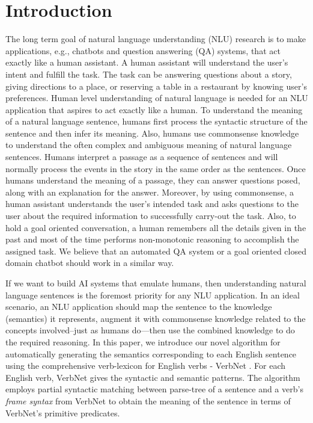 \documentclass[letterpaper]{article}
\begin{document}
\section{Introduction}

The long term goal of natural language understanding (NLU) research is to make applications, e.g., chatbots and question answering (QA) systems, that act exactly like a human assistant. A human assistant will understand the user's intent and fulfill the task. The task can be answering questions about a story, giving directions to a place, or  reserving a table in a restaurant by knowing user's preferences. Human level understanding of natural language is needed for an NLU application that aspires to act exactly like a human. To understand the meaning of a natural language sentence, humans first process the syntactic structure of the sentence and then infer its meaning. Also, humans use commonsense knowledge to understand the often complex and ambiguous meaning of natural language sentences. Humans interpret a passage as a sequence of sentences and will normally process the events in the story in the same order as the sentences. Once humans understand the meaning of a passage, they can answer questions posed, along with an explanation for the answer. Moreover, by using commonsense, a human assistant understands the user's intended task and asks questions to the user about the required information to successfully carry-out the task. Also, to hold a goal oriented conversation, a human remembers all the details given in the past and most of the time performs non-monotonic reasoning to accomplish the assigned task. We believe that an automated QA system or a goal oriented closed domain chatbot should work in a similar way.

If we want to build AI systems that emulate humans, then understanding natural language sentences is the foremost priority for any NLU application. In an ideal scenario, an NLU application should map the sentence to the knowledge (semantics) it represents, augment it with commonsense knowledge related to the concepts involved--just as humans do---then use the combined knowledge to do the required reasoning. In this paper, we introduce our novel algorithm for automatically generating the semantics corresponding to each English sentence using the comprehensive verb-lexicon for English verbs - VerbNet \cite{vn}. For each English verb, VerbNet gives the syntactic and semantic patterns. The algorithm employs partial syntactic matching between parse-tree of a sentence and a verb's \textit{frame syntax} from VerbNet to obtain the meaning of the sentence in terms of VerbNet's primitive predicates.
\end{document}
